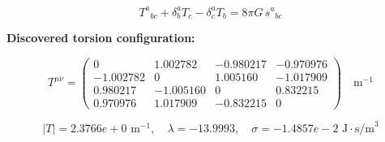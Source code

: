 
\begin{equation}
  T^a{}_{bc} + \delta^a_b T_c - \delta^a_c T_b = 8\pi G \, s^a{}_{bc}
\end{equation}

\textbf{Discovered torsion configuration:}

\begin{equation}
  T^{\mu\nu} = \begin{pmatrix}
    0 & 1.002782 & -0.980217 & -0.970976 \\
    -1.002782 & 0 & 1.005160 & -1.017909 \\
    0.980217 & -1.005160 & 0 & 0.832215 \\
    0.970976 & 1.017909 & -0.832215 & 0
  \end{pmatrix} \quad \text{m}^{-1}
\end{equation}

\begin{equation}
  |T| = 2.3766e+0 \text{ m}^{-1}, \quad
  \lambda = -13.9993, \quad
  \sigma = -1.4857e-2 \text{ J}\cdot\text{s/m}^3
\end{equation}